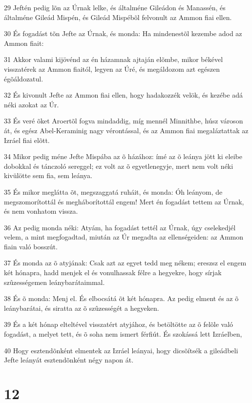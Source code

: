 \par 29 Jeftén pedig lõn az Úrnak lelke, és általméne Gileádon és Manassén, és általméne Gileád Mispén, és Gileád Mispébõl felvonult az Ammon fiai ellen.
\par 30 És fogadást tõn Jefte az Úrnak, és monda: Ha mindenestõl kezembe adod az Ammon fiait:
\par 31 Akkor valami kijövénd az én házamnak ajtaján elõmbe, mikor békével visszatérek az Ammon fiaitól, legyen az Úré, és megáldozom azt egészen égõáldozatul.
\par 32 És kivonult Jefte az Ammon fiai ellen, hogy hadakozzék velök, és kezébe adá néki azokat az Úr.
\par 33 És veré õket Aroertõl fogva mindaddig, míg mennél Minnithbe, húsz városon át, és egész Abel-Keraminig nagy vérontással, és az Ammon fiai megaláztattak az Izráel fiai elõtt.
\par 34 Mikor pedig méne Jefte Mispába az õ házához: ímé az õ leánya jött ki eleibe dobokkal és tánczoló sereggel; ez volt az õ egyetlenegyje, mert nem volt néki kivülötte sem fia, sem leánya.
\par 35 És mikor meglátta õt, megszaggatá ruháit, és monda: Óh leányom, de megszomorítottál és megháborítottál engem! Mert én fogadást tettem az Úrnak, és nem vonhatom vissza.
\par 36 Az pedig monda néki: Atyám, ha fogadást tettél az Úrnak, úgy cselekedjél velem, a mint megfogadtad, miután az Úr megadta az ellenségeiden: az Ammon fiain való bosszút.
\par 37 És monda az õ atyjának: Csak azt az egyet tedd meg nékem; ereszsz el engem két hónapra, hadd menjek el és vonulhassak félre a hegyekre, hogy sírjak szûzességemen leánybarátaimmal.
\par 38 És õ monda: Menj el. És elbocsátá õt két hónapra. Az pedig elment és az õ leánybarátai, és siratta az õ szûzességét a hegyeken.
\par 39 És a két hónap elteltével visszatért atyjához, és betöltötte az õ felõle való fogadást, a melyet tett, és õ soha nem ismert férfiút. És szokássá lett Izráelben,
\par 40 Hogy esztendõnként elmentek az Izráel leányai, hogy dicsõítsék a gileádbeli Jefte leányát esztendõnként négy napon át.

\chapter{12}

